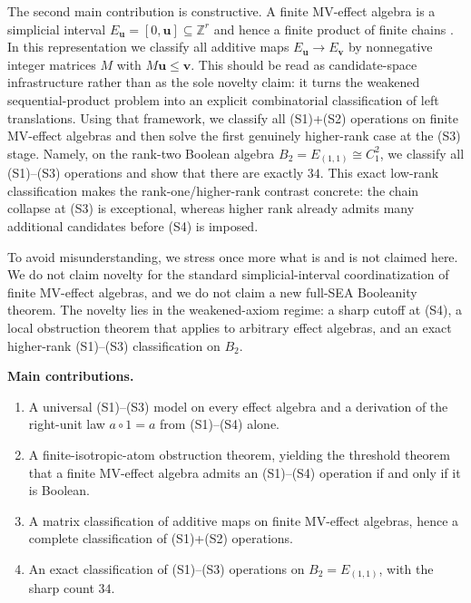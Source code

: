 \documentclass[11pt]{article}
\theoremstyle{definition}
\theoremstyle{remark}
\numberwithin{equation}{section}
\newcommand{\ZZ}{\mathbb{Z}}
\begin{document}
The second main contribution is constructive. A finite MV-effect algebra is a simplicial interval $E_{\mathbf u}=[0,\mathbf u]\subseteq \ZZ^r$ and hence a finite product of finite chains \cite{JencovaPulmannova2008}. In this representation we classify all additive maps $E_{\mathbf u}\to E_{\mathbf v}$ by nonnegative integer matrices $M$ with $M\mathbf u\le \mathbf v$. This should be read as candidate-space infrastructure rather than as the sole novelty claim: it turns the weakened sequential-product problem into an explicit combinatorial classification of left translations. Using that framework, we classify all \textup{(S1)}+\textup{(S2)} operations on finite MV-effect algebras and then solve the first genuinely higher-rank case at the \textup{(S3)} stage. Namely, on the rank-two Boolean algebra $B_2=E_{(1,1)}\cong C_1^2$, we classify all \textup{(S1)}--\textup{(S3)} operations and show that there are exactly $34$. This exact low-rank classification makes the rank-one/higher-rank contrast concrete: the chain collapse at \textup{(S3)} is exceptional, whereas higher rank already admits many additional candidates before \textup{(S4)} is imposed.

To avoid misunderstanding, we stress once more what is and is not claimed here. We do not claim novelty for the standard simplicial-interval coordinatization of finite MV-effect algebras, and we do not claim a new full-SEA Booleanity theorem. The novelty lies in the weakened-axiom regime: a sharp cutoff at \textup{(S4)}, a local obstruction theorem that applies to arbitrary effect algebras, and an exact higher-rank \textup{(S1)}--\textup{(S3)} classification on $B_2$.

\medskip
\noindent\textbf{Main contributions.}
\begin{enumerate}[leftmargin=2.6em]
    \item A universal \textup{(S1)}--\textup{(S3)} model on every effect algebra and a derivation of the right-unit law $a\circ 1=a$ from \textup{(S1)}--\textup{(S4)} alone.
    \item A finite-isotropic-atom obstruction theorem, yielding the threshold theorem that a finite MV-effect algebra admits an \textup{(S1)}--\textup{(S4)} operation if and only if it is Boolean.
    \item A matrix classification of additive maps on finite MV-effect algebras, hence a complete classification of \textup{(S1)}+\textup{(S2)} operations.
    \item An exact classification of \textup{(S1)}--\textup{(S3)} operations on $B_2=E_{(1,1)}$, with the sharp count $34$.
\end{enumerate}
\end{document}
